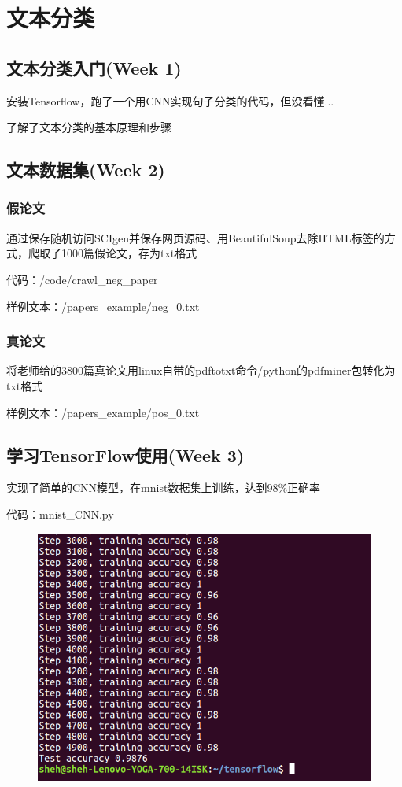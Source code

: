 \documentclass[UTF8]{ctexart}
\begin{document}
	\section{文本分类}
	\subsection{文本分类入门(Week 1)}
	安装Tensorflow，跑了一个用CNN实现句子分类的代码，但没看懂...
	
	了解了文本分类的基本原理和步骤
	\subsection{文本数据集(Week 2)}
		\subsubsection{假论文}
		通过保存随机访问SCIgen并保存网页源码、用BeautifulSoup去除HTML标签的方式，爬取了1000篇假论文，存为txt格式
		
		代码：/code/crawl\_neg\_paper
		
		
		样例文本：/papers\_example/neg\_0.txt
		
		\subsubsection{真论文}
		将老师给的3800篇真论文用linux自带的pdftotxt命令/python的pdfminer包转化为txt格式
		
		样例文本：/papers\_example/pos\_0.txt
	
	\subsection{学习TensorFlow使用(Week 3)}
	实现了简单的CNN模型，在mnist数据集上训练，达到98\%正确率
	
	代码：mnist\_CNN.py
	\begin{figure}
		\centering
		\includegraphics[scale=0.6]{6.png}	
	\end{figure}
	
\end{document}
